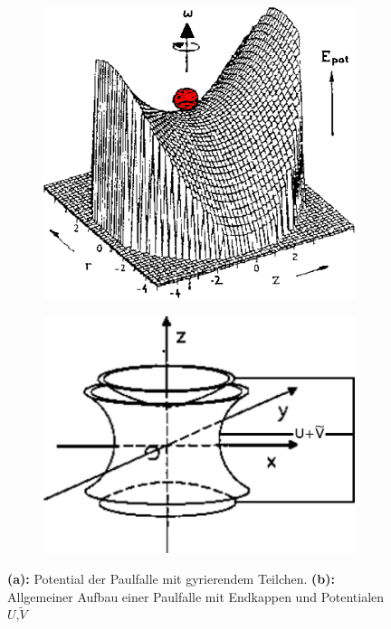 \documentclass[numbers=noenddot,a4paper,notitlepage,twoside,BCOR15mm]{scrartcl}
\newcommand{\fett}[1]{\textbf{#1}}
\begin{document}
		\begin{figure}[h]
			\centering
			\begin{subfigure}{0.35\textwidth}
				\includegraphics[width=\textwidth]{paulpotential.png}
				\caption{}
				\label{img:potential}
			\end{subfigure}
			\begin{subfigure}{0.4\textwidth}
				\includegraphics[width=\textwidth]{paulfalle.png}
				\caption{}
				\label{img:paulfalle}
			\end{subfigure}
			\caption{\fett{(a):} Potential der Paulfalle mit gyrierendem Teilchen. \fett{(b):} Allgemeiner Aufbau einer Paulfalle mit Endkappen und Potentialen $U$,$\tilde{V}$ \cite{UMainzReflektron}}
		\end{figure}
\end{document}
